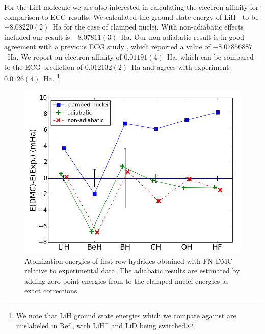 \documentclass[pra,superscriptaddress,groupedaddress,twocolumn]{revtex4}
\begin{document}
For the LiH molecule we are also interested in calculating the electron affinity for comparison to ECG results. We calculated the ground state energy of LiH$^-$ to be $-8.08220(2)$~Ha for the case of clamped nuclei.  With non-adiabatic effects included our result is  $-8.07811(3)$~Ha. Our non-adiabatic result is in good agreement with a previous ECG study \cite{Bubin_LiH_noBO}, which reported a value of $-8.07856887$~Ha. We report an electron affinity of $0.01191(4)$~Ha, which can be compared to the ECG prediction of $0.012132(2)$~Ha and agrees with experiment, $0.0126(4)$~Ha. \footnote{We note that LiH ground state energies which we compare against are mislabeled in Ref.\cite{Bubin_LiH_noBO}, with $\text{LiH}^-$ and LiD being switched.}

\begin{figure}[h]
\centering
\includegraphics[scale=.4]{Figures/atomization}
\caption{Atomization energies of first row hydrides obtained with FN-DMC relative to experimental data. The adiabatic results are estimated by adding zero-point energies from \cite{Feller_Corrections} to the clamped nuclei energies as exact corrections. \label{fig:atomization}}
\end{figure}
\end{document}

